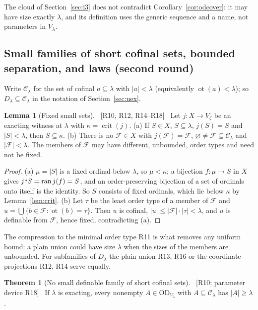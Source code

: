 \documentclass[11pt,letterpaper]{article}
\theoremstyle{definition}
\newtheorem{theorem}[definition]{Theorem}
\newtheorem{lemma}[definition]{Lemma}
\numberwithin{equation}{section}
\newcommand{\OD}{\mathrm{OD}}
\newcommand{\crit}{\operatorname{crit}}
\newcommand{\ot}{\operatorname{ot}}
\newcommand{\ran}{\operatorname{ran}}
\newcommand{\FF}{\mathcal F}
\newcommand{\Clam}{\mathcal C_\lambda}
\newcommand{\src}[1]{\unskip\ {\normalfont\small\sffamily\color{Olive}[#1]}\ }
\newcommand{\R}[1]{\textsf{R#1}}
\begin{document}
The cloud of Section~\ref{sec:i3} does not contradict Corollary~\ref{cor:odcover}: it may have size exactly $\lambda$, and its definition uses the generic sequence and a name, not parameters in $V_\lambda$.

\subsection{Small families of short cofinal sets, bounded separation, and laws (second round)}\label{sec:smallfam}

Write $\Clam$ for the set of cofinal $a\subseteq\lambda$ with $|a|<\lambda$ (equivalently $\ot(a)<\lambda$); so $D_\lambda\subseteq\Clam$ in the notation of Section~\ref{sec:uex}.

\begin{lemma}[Fixed small sets]\label{lem:fixedsmall}\src{R10, R12, R14--R18}
Let $j:X\to V_\zeta$ be an exacting witness at $\lambda$ with $\kappa=\crit(j)$.
(a) If $S\in X$, $S\subseteq\lambda$, $j(S)=S$ and $|S|<\lambda$, then $S\subseteq\kappa$.
(b) There is no $\FF\in X$ with $j(\FF)=\FF$, $\varnothing\ne\FF\subseteq\Clam$ and $|\FF|<\lambda$. The members of $\FF$ may have different, unbounded, order types and need not be fixed.
\end{lemma}

\begin{proof}
(a) $\mu=|S|$ is a fixed ordinal below $\lambda$, so $\mu<\kappa$; a bijection $f:\mu\to S$ in $X$ gives $j``S=\ran j(f)=S$, and an order-preserving bijection of a set of ordinals onto itself is the identity. So $S$ consists of fixed ordinals, which lie below $\kappa$ by Lemma~\ref{lem:crit}. (b) Let $\tau$ be the least order type of a member of $\FF$ and $u=\bigcup\{b\in\FF:\ot(b)=\tau\}$. Then $u$ is cofinal, $|u|\le|\FF|\cdot|\tau|<\lambda$, and $u$ is definable from $\FF$, hence fixed, contradicting (a).
\end{proof}

The compression to the minimal order type \R{11} is what removes any uniform bound: a plain union could have size $\lambda$ when the sizes of the members are unbounded. For subfamilies of $D_\lambda$ the plain union \R{13}, \R{16} or the coordinate projections \R{12}, \R{14} serve equally.

\begin{theorem}[No small definable family of short cofinal sets]\label{thm:smallC}\src{R10; parameter device R18}
If $\lambda$ is exacting, every nonempty $A\in\OD_{V_\lambda}$ with $A\subseteq\Clam$ has $|A|\ge\lambda$.
\end{theorem}
\end{document}

